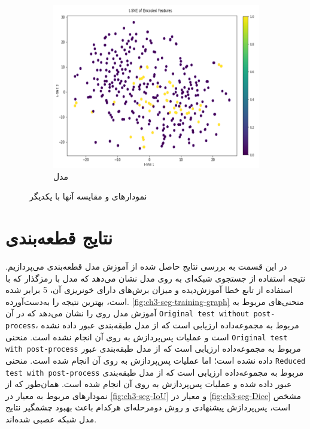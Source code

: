\begin{figure}[h!]
\begin{subfigure}{0.33\textwidth}
			\includegraphics[width=\linewidth]{Images/Chapter3/tsne-other.png}
			\caption{مدل  
			\cite{Ganeshkumar2022Identification}}
			\label{fig:ch3-tsne-other}
        \end{subfigure}
		\caption{نمودارهای 
		و مقایسه آنها با یکدیگر}
		\label{fig:ch3-tsne}
\end{figure}


\section{نتایج قطعه‌بندی}
در این قسمت به بررسی نتایج حاصل شده از آموزش مدل قطعه‌بندی 
 می‌پردازیم. نتیجه استفاده از جستجوی شبکه‌ای به روی مدل 
 نشان می‌دهد که مدل با رمزگذار 
که با استفاده از تابع خطا
آموزش‌دیده و میزان برش‌های دارای خونریزی آن، 5 برابر شده است، بهترین نتیجه را به‌دست‌آورده‌.
 \autoref{fig:ch3-seg-training-graph}
 منحنی‌های مربوط به آموزش مدل روی 
را نشان می‌دهد که در آن 
 \texttt{Original test without post-process}،
 مربوط به مجموعه‌داده ارزیابی است که از مدل طبقه‌بندی عبور داده نشده است و عملیات پس‌پردازش به روی آن انجام نشده است.
 منحنی 
 \texttt{Original test with post-process}
 مربوط به مجموعه‌داده ارزیابی است که از مدل طبقه‌بندی عبور داده نشده‌ است؛ اما عملیات پس‌پردازش به روی آن انجام شده است.
منحنی 
 \texttt{Reduced test with post-process}
 مربوط به مجموعه‌داده ارزیابی است که از مدل طبقه‌بندی عبور داده شده و عملیات پس‌پردازش به روی آن انجام شده است.
 همان‌طور که از نمودارهای مربوط به معیار
 در 
 \autoref{fig:ch3-seg-IoU}
 و معیار 
  در 
  \autoref{fig:ch3-seg-Dice}
  مشخص است،‌ پس‌پردازش پیشنهادی و روش دومرحله‌ای هرکدام باعث بهبود چشمگیر نتایج مدل شبکه عصبی شده‌اند.
 

